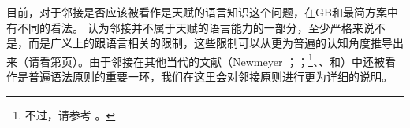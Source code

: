 

目前，对于邻接是否应该被看作是天赋的语言知识这个问题，在GB和最简方案中有不同的看法。 \citet*{HCF2002a}认为邻接并不属于天赋的语言能力的一部分，至少严格来说不是，而是广义上的跟语言相关的限制，这些限制可以从更为普遍的认知角度推导出来（请看第\pageref{Seite-Subjazenz-Performanz}页）。由于邻接在其他当代的文献（Newmeyer \citeyear[, 74--75]{Newmeyer2005a}；\citeyear[]{Newmeyer2004b}；\citealp{Baltin2006a}\footnote{%
不过，请参考 。
}、\citealp{Baker2009a}、\citealp{Freidin2009a}和\citealp{Rizzi2009a,Rizzi2009b}）中还被看作是普遍语法原则的重要一环，我们在这里会对邻接原则进行更为详细的说明。

